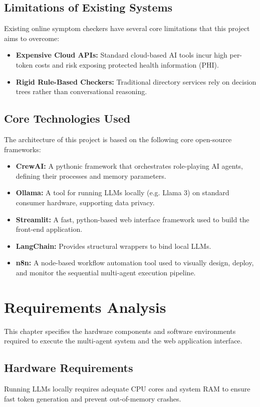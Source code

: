 \documentclass[12pt,a4paper]{report}
\begin{document}
\section{Limitations of Existing Systems}
Existing online symptom checkers have several core limitations that this project aims to overcome:
\begin{itemize}
    \item \textbf{Expensive Cloud APIs:} Standard cloud-based AI tools incur high per-token costs and risk exposing protected health information (PHI).
    \item \textbf{Rigid Rule-Based Checkers:} Traditional directory services rely on decision trees rather than conversational reasoning.
\end{itemize}

\section{Core Technologies Used}
The architecture of this project is based on the following core open-source frameworks:
\begin{itemize}
    \item \textbf{CrewAI:} A pythonic framework that orchestrates role-playing AI agents, defining their processes and memory parameters.
    \item \textbf{Ollama:} A tool for running LLMs locally (e.g. Llama 3) on standard consumer hardware, supporting data privacy.
    \item \textbf{Streamlit:} A fast, python-based web interface framework used to build the front-end application.
    \item \textbf{LangChain:} Provides structural wrappers to bind local LLMs.
    \item \textbf{n8n:} A node-based workflow automation tool used to visually design, deploy, and monitor the sequential multi-agent execution pipeline.
\end{itemize}

\chapter{Requirements Analysis}
This chapter specifies the hardware components and software environments required to execute the multi-agent system and the web application interface.

\section{Hardware Requirements}
Running LLMs locally requires adequate CPU cores and system RAM to ensure fast token generation and prevent out-of-memory crashes.
\end{document}
